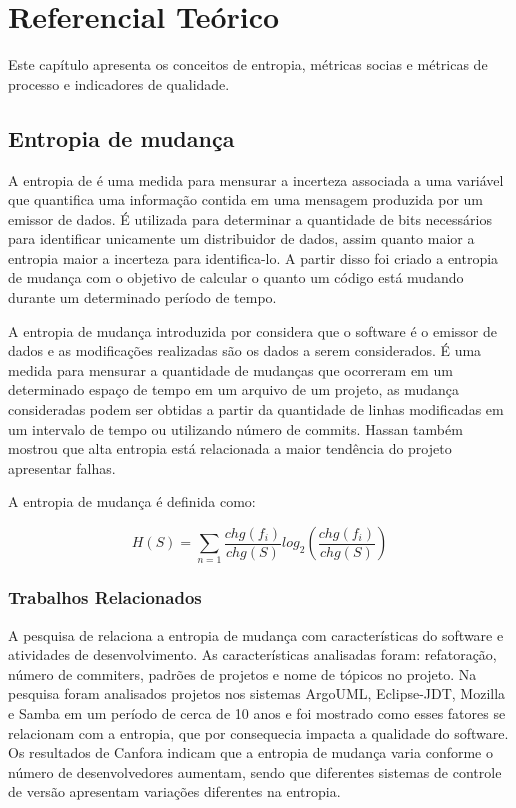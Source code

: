 \chapter{Referencial Teórico}
Este capítulo apresenta os conceitos de entropia, métricas socias e métricas de processo e indicadores de qualidade.

\section{Entropia de mudança}
A entropia de  é uma medida para mensurar a incerteza associada a uma variável que quantifica uma informação contida em uma mensagem produzida por um emissor de dados. É utilizada para determinar a quantidade de bits necessários para identificar unicamente um distribuidor de dados, assim quanto maior a entropia maior a incerteza para identifica-lo. A partir disso foi criado a entropia de mudança com o objetivo de calcular o quanto um código está mudando durante um determinado período de tempo. 

A entropia de mudança introduzida por  considera que o software é o emissor de dados e as modificações realizadas são os dados a serem considerados. É uma medida para mensurar a quantidade de mudanças que ocorreram em um determinado espaço de tempo em um arquivo de um projeto, as mudança consideradas podem ser obtidas a partir da quantidade de linhas modificadas em um intervalo de tempo ou utilizando número de commits. Hassan também mostrou que alta entropia está relacionada a maior tendência do projeto apresentar falhas.

A entropia de mudança é definida como:

\begin{equation}
H(S) = {\sum\limits_{n=1} }\frac{chg(f_i)}{chg(S)}log_2(\frac{chg(f_i)}{chg(S)})
\end{equation}

\subsection{Trabalhos Relacionados}
A pesquisa de  relaciona a entropia de mudança com características do software e atividades de desenvolvimento. As características analisadas foram: refatoração, número de commiters, padrões de projetos e nome de tópicos no projeto. Na pesquisa foram analisados projetos nos sistemas ArgoUML, Eclipse-JDT, Mozilla e Samba em um período de cerca de 10 anos e foi mostrado como esses fatores se relacionam com a entropia, que por consequecia impacta a qualidade do software. Os resultados de Canfora indicam que a entropia de mudança varia conforme o número de desenvolvedores aumentam, sendo que diferentes sistemas de controle de versão apresentam variações diferentes na entropia.

